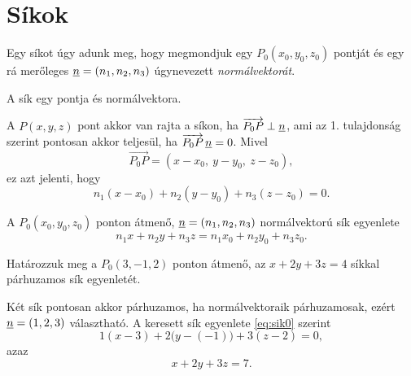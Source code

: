 \documentclass[11pt]{article}
\begin{document}
\section{Síkok}

Egy síkot úgy adunk meg, hogy megmondjuk egy $P_{0}(x_{0}, y_{0}, z_{0})$ pontját és egy rá merőleges $\underline{n}=(n_{1}, n_{2}, n_{3})$ úgynevezett \emph{normálvektorát}.

\begin{notefig}{A sík egy pontja és normálvektora.}
\end{notefig}

\noindent A $P(x, y, z)$ pont akkor van rajta a síkon, ha $\overrightarrow{P_{0}P}\perp\underline{n}$, ami az 1. tulajdonság szerint pontosan akkor teljesül, ha $\overrightarrow{P_{0}P}\,\underline{n}=0$. Mivel
\[
\overrightarrow{P_{0}P}=(x-x_{0},\ y-y_{0},\ z-z_{0}),
\]
ez azt jelenti, hogy
\begin{equation}\label{eq:sik0}
n_{1}(x-x_{0})+n_{2}(y-y_{0})+n_{3}(z-z_{0})=0 .
\end{equation}

\begin{thmbox}
\begin{theorem}
A $P_{0}(x_{0}, y_{0}, z_{0})$ ponton átmenő, $\underline{n}=(n_{1}, n_{2}, n_{3})$ normálvektorú sík egyenlete
\begin{equation}\label{eq:sik}
n_{1}x+n_{2}y+n_{3}z=n_{1}x_{0}+n_{2}y_{0}+n_{3}z_{0}.
\end{equation}
\end{theorem}
\end{thmbox}

\begin{exbox}
\begin{example}
Határozzuk meg a $P_{0}(3, -1, 2)$ ponton átmenő, az $x+2y+3z=4$ síkkal párhuzamos sík egyenletét.
\end{example}
\end{exbox}
\begin{solution}
Két sík pontosan akkor párhuzamos, ha normálvektoraik párhuzamosak, ezért $\underline{n}=(1, 2, 3)$ választható. A keresett sík egyenlete \eqref{eq:sik0} szerint
\[
1(x-3)+2\bigl(y-(-1)\bigr)+3(z-2)=0,
\]
azaz
\[
x+2y+3z=7 .
\]
\end{solution}
\end{document}
